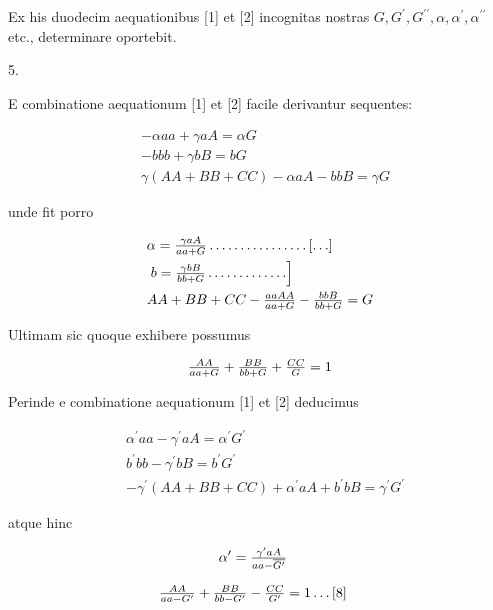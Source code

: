\documentclass[twoside,12pt, showframe]{memoir}
\let\oldfrac\frac
\def\frac#1#2{\mathchoice{\tfrac{#1}{#2}}{\oldfrac{#1}{#2}}{\genfrac{}{}{}{2}{#1}{#2\mathstrut}}{\genfrac{}{}{}{3}{#1}{#2\mathstrut}}}
\begin{document}
Ex his duodecim aequationibus [1] et [2] incognitas nostras \(G, G^{\prime}, G^{\prime \prime}, \alpha, \alpha^{\prime}, \alpha^{\prime \prime}\) etc., determinare oportebit.

5.

E combinatione aequationum [1] et [2] facile derivantur sequentes:

\[
\begin{aligned}
& -\alpha a a+\gamma a A=\alpha G \\
& -b b b+\gamma b B=b G \\
& \gamma(A A+B B+C C)-\alpha a A-b b B=\gamma G
\end{aligned}
\]

unde fit porro

\[
\begin{aligned}
& \alpha=\frac{\gamma a A}{a a+G} \ldots \ldots \ldots \ldots . \ldots[\ldots] \\
& \left.b=\frac{\gamma b B}{b b+G} \ldots \ldots \ldots . \ldots\right] \\
& A A+B B+C C-\frac{a a A A}{a a+G}-\frac{b b B}{b b+G}=G
\end{aligned}
\]

Ultimam sic quoque exhibere possumus

\[
\frac{A A}{a a+G}+\frac{B B}{b b+G}+\frac{C C}{G}=1
\]

Perinde e combinatione aequationum [1] et [2] deducimus

\[
\begin{aligned}
& \alpha^{\prime} a a-\gamma^{\prime} a A=\alpha^{\prime} G^{\prime} \\
& b^{\prime} b b-\gamma^{\prime} b B=b^{\prime} G^{\prime} \\
& -\gamma^{\prime}(A A+B B+C C)+\alpha^{\prime} a A+b^{\prime} b B=\gamma^{\prime} G^{\prime}
\end{aligned}
\]

atque hinc

\[
\begin{aligned}
& \alpha^{\prime}=\frac{\gamma^{\prime} a A}{a a-\overline{G^{\prime}}}
\end{aligned}
\]

\begin{center}
\end{center}

\[
\begin{aligned}
& \frac{A A}{a a-G^{\prime}}+\frac{B B}{b b-G^{\prime}}-\frac{C C}{G^{\prime}}=1 \ldots[8]
\end{aligned}
\]
\end{document}
